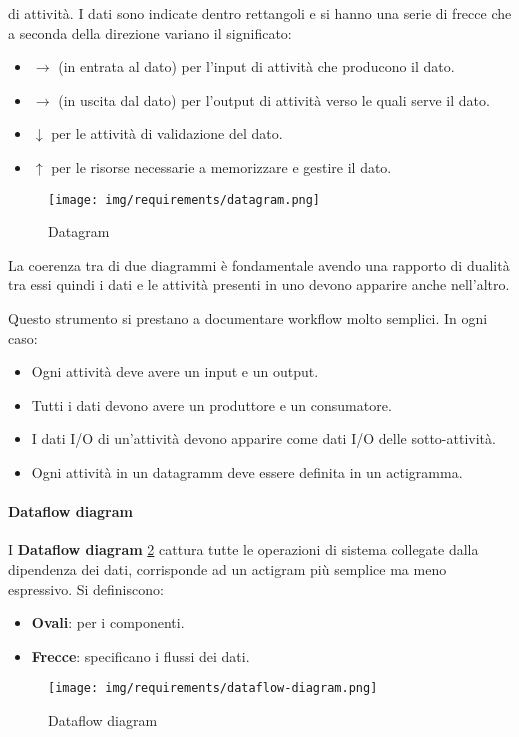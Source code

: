 \begin{enumerate}
            di attività. I dati sono indicate dentro rettangoli e si hanno una
            serie di frecce che a seconda della direzione variano il significato:
            \begin{itemize}
                  \item $\to$ (in entrata al dato) per l'input di attività che
                        producono il dato.
                  \item $\to$ (in uscita dal dato) per l'output di attività verso
                        le quali serve il dato.
                  \item $\downarrow$ per le attività di validazione del dato.
                  \item $\uparrow$ per le risorse necessarie a memorizzare e
                        gestire il dato.
            \end{itemize}
            \begin{figure}[!ht]
                  \centering
                  \texttt{[image: img/requirements/datagram.png]}
                  \caption{Datagram}
                  \label{fig:datagram}
            \end{figure}
\end{enumerate}
La coerenza tra di due diagrammi è fondamentale avendo una rapporto di dualità
tra essi quindi i dati e le attività presenti in uno devono apparire anche
nell'altro.

Questo strumento si prestano a documentare workflow molto semplici. In ogni caso:
\begin{itemize}
      \item Ogni attività deve avere un input e un output.
      \item Tutti i dati devono avere un produttore e un consumatore.
      \item I dati I/O di un'attività devono apparire come dati I/O delle
            sotto-attività.
      \item Ogni attività in un datagramm deve essere definita in un actigramma.
\end{itemize}
\paragraph{Dataflow diagram}
I \textbf{Dataflow diagram} \ref{fig:dataflow-diagram} cattura tutte le operazioni
di sistema collegate dalla dipendenza dei dati, corrisponde ad un actigram più
semplice ma meno espressivo. Si definiscono:
\begin{itemize}
      \item \textbf{Ovali}: per i componenti.
      \item \textbf{Frecce}: specificano i flussi dei dati.
\end{itemize}
\begin{figure}[!ht]
      \centering
      \texttt{[image: img/requirements/dataflow-diagram.png]}
      \caption{Dataflow diagram}
      \label{fig:dataflow-diagram}
\end{figure}
